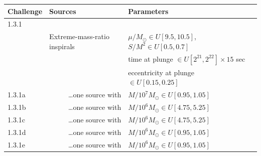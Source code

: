 \documentclass[12pt]{iopart}
\begin{document}
\begin{table}
\begin{tabular}{llll}
\hline
Challenge & Sources & Parameters \\
\hline
\multicolumn{2}{l}{1.3.1} & \\
&Extreme-mass-ratio inspirals & $\mu/M_\odot \in U[9.5,10.5]$, $S/M^2 \in U[0.5, 0.7]$ \\
&                                             & time at plunge $\in  U[2^{21},2^{22}] \times 15$ sec \\
&                                             & eccentricity at plunge $\in U[0.15, 0.25]$ \\
1.3.1a &\multicolumn{1}{r}{\ldots one source with}          & $M / 10^7 M_\odot \in U[0.95,1.05]$ \\
1.3.1b &\multicolumn{1}{r}{\ldots one source with}         & $M / 10^6 M_\odot \in U[4.75,5.25]$ \\
1.3.1c &\multicolumn{1}{r}{\ldots one source with}         & $M / 10^6 M_\odot \in U[4.75,5.25]$ \\
1.3.1d &\multicolumn{1}{r}{\ldots one source with}         & $M / 10^6 M_\odot \in U[0.95,1.05]$ \\
1.3.1e &\multicolumn{1}{r}{\ldots one source with}         & $M / 10^6 M_\odot \in U[0.95,1.05]$ \\
\hline


\end{tabular}
\end{table}
\end{document}
